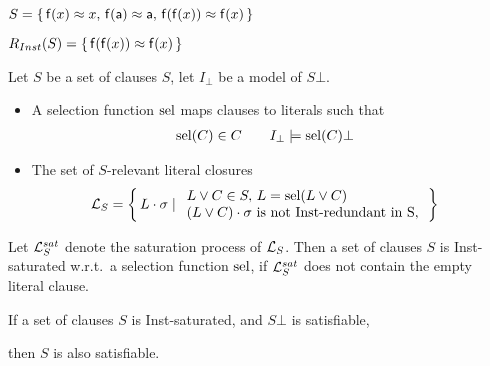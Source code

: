 \begin{example}
    $S =
        \{\,
        \mathsf{f}(x)\approx x,\,
        \mathsf{f}(\mathsf{a})\approx \mathsf{a},\,
        \mathsf{f}(\mathsf{f}(x))\approx\mathsf{f}(x)
        \,\}$

    \(R_{Inst}(S) = \{\, \mathsf{f}(\mathsf{f}(x))\approx\mathsf{f}(x) \,\}\)
    \end{example}

    \begin{definition}[S-Relevance]
        Let \(S\) be a set of clauses \(S\), let \(I_\bot\) be a model of \(S\bot\).

        \begin{itemize}
            \item
        A selection function \(\operatorname{sel}\) maps clauses to literals such that
        \begin{align*}
            \operatorname{sel}(C)&\in C
            &&&
            I_\bot&\models\operatorname{sel}(C)\bot
        \end{align*}

        \item
        The set of \(S\)-relevant literal closures
        \begin{align*}
            \mathcal{L}_S &= \left\{\, L\cdot\sigma \mid
            \begin{array}{l}
                L\lor C\in S,\,L = \operatorname{sel}(L\lor C)\\
                (L\lor C)\cdot\sigma\text{ is not Inst-redundant in S},\\
            \end{array}
            \,\right\}
        \end{align*}




    \end{itemize}
\end{definition}

\begin{definition}
    Let \(\mathcal{L}_S^{sat}\) denote the saturation process of \(\mathcal{L}_S\).
    Then a set of clauses \(S\) is Inst-saturated w.r.t.~a selection function \(\operatorname{sel}\),
            if \(\mathcal{L}_S^{sat}\) does not contain the empty literal clause.
\end{definition}
        \begin{theorem}
        If a set of clauses \(S\) is Inst-saturated,
        and \(S\bot\) is satisfiable,

        then \(S\) is also satisfiable.
        \end{theorem}

